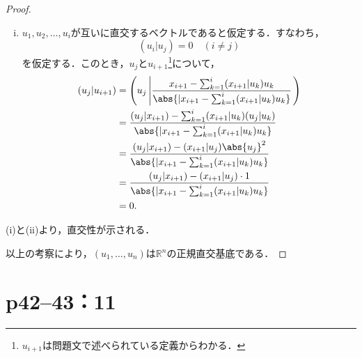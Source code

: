 \documentclass[a4paper,10pt,fleqn]{ltjsarticle}
\begin{document}
\begin{tleftbar}
\begin{proof}
\begin{description}
\begin{enumerate}[(i)]
                      \item $u_1, u_2, \ldots, u_i$が互いに直交するベクトルであると仮定する．すなわち，
                            \[
                                (u_i | u_j) = 0 \quad (i \ne j)
                            \]
                            を仮定する．このとき，$u_j$と$u_{i+1}$\footnote{$u_{i+1}$は問題文で述べられている定義からわかる．}について，
                            \begin{align*}
                                (u_j | u_{i+1}) & =\left  ( u_j \left| \frac{x_{i+1} - \sum_{k=1}^{i} (x_{i+1} | u_k) u_k}{\abs{| x_{i+1} - \sum_{k=1}^{i} (x_{i+1} | u_k) u_k }} \right. \right) \\
                                                & = \frac{(u_j | x_{i+1}) - \sum_{k=1}^{i} (x_{i+1} | u_k) (u_j | u_k)}{\abs{| x_{i+1} - \sum_{k=1}^{i} (x_{i+1} | u_k) u_k }}                    \\
                                                & = \frac{(u_j | x_{i+1}) - (x_{i+1} | u_j) \abs{u_j}^2}{\abs{| x_{i+1} - \sum_{k=1}^{i} (x_{i+1} | u_k) u_k }}                                   \\
                                                & = \frac{(u_j | x_{i+1}) - (x_{i+1} | u_j) \cdot 1}{\abs{| x_{i+1} - \sum_{k=1}^{i} (x_{i+1} | u_k) u_k }}                                       \\
                                                & = 0.
                            \end{align*}
                  \end{enumerate}
                  (i)と(ii)より，直交性が示される．
        \end{description}
        以上の考察により，$(u_1, \ldots, u_n)$は$\mathbb{R}^n$の正規直交基底である．
    \end{proof}
\end{tleftbar}

\newpage

\section*{p42--43：11}
\end{document}
